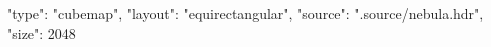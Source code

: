 {
    "type": "cubemap",
    "layout": "equirectangular",
    "source": ".source/nebula.hdr",
    "size": 2048
}

